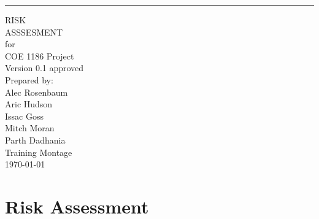 \documentclass{scrreprt}
\date{}
\def\myversion{0.1 }
\begin{document}
\begin{flushright}
    \rule{16cm}{5pt}\vskip1cm
    \begin{bfseries}
        \Huge{RISK\\ ASSSESMENT}\\
        \vspace{.9cm}
        for\\
        \vspace{.9cm}
        COE 1186 Project\\
        \vspace{.9cm}
        \LARGE{Version \myversion approved}\\
        \vspace{.9cm}
        Prepared by:\\
        Alec Rosenbaum\\
        Aric Hudson\\
        Issac Goss\\
        Mitch Moran\\
        Parth Dadhania\\
        \vspace{1.9cm}
        Training Montage\\
        \vspace{.9cm}
        \today\\
    \end{bfseries}
\end{flushright}

\chapter{Risk Assessment}
\end{document}
